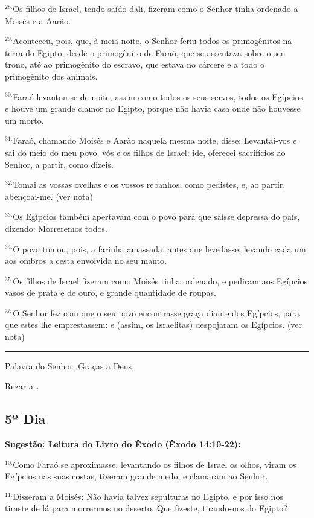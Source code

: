 \documentclass[a4paper,14pt]{extarticle} \usepackage[utf8]{inputenc}
\begin{document}
$^{28.}$Os filhos de Israel, tendo saído dali, fizeram como o Senhor tinha ordenado a Moisés e a Aarão.

$^{29.}$Aconteceu, pois, que, à meia-noite, o Senhor feriu todos os primogênitos na terra do Egipto, desde o primogênito de Faraó, que se assentava sobre o seu trono, até ao primogênito do escravo, que estava no cárcere e a todo o primogênito dos animais.

$^{30.}$Faraó levantou-se de noite, assim como todos os seus servos, todos os Egípcios, e houve um grande clamor no Egipto, porque não havia casa onde não houvesse um morto.

$^{31.}$Faraó, chamando Moisés e Aarão naquela mesma noite, disse: Levantai-vos e sai do meio do meu povo, vós e os filhos de Israel: ide, oferecei sacrifícios ao Senhor, a partir, como dizeis.

$^{32.}$Tomai as vossas ovelhas e os vossos rebanhos, como pedistes, e, ao partir, abençoai-me. (ver nota)

$^{33.}$Os Egípcios também apertavam com o povo para que saísse depressa do país, dizendo: Morreremos todos.

$^{34.}$O povo tomou, pois, a farinha amassada, antes que levedasse, levando cada um aos ombros a cesta envolvida no seu manto.

$^{35.}$Os filhos de Israel fizeram como Moisés tinha ordenado, e pediram aos Egípcios vasos de prata e de ouro, e grande quantidade de roupas.

$^{36.}$O Senhor fez com que o seu povo encontrasse graça diante dos Egípcios, para que estes lhe emprestassem: e (assim, os Israelitas) despojaram os Egípcios. (ver nota)


\par\noindent\rule{\textwidth}{0.4pt}

Palavra do Senhor. Graças a Deus.

Rezar a \textbf{.}
\subsection{5º Dia}
\textbf{Sugestão: Leitura do Livro do Êxodo (Êxodo 14:10-22):}

$^{10.}$Como Faraó se aproximasse, levantando os filhos de Israel os olhos, viram os Egípcios nas suas costas, tiveram grande medo, e clamaram ao Senhor.

$^{11.}$Disseram a Moisés: Não havia talvez sepulturas no Egipto, e por isso nos tiraste de lá para morrermos no deserto. Que fizeste, tirando-nos do Egipto?
\end{document}
